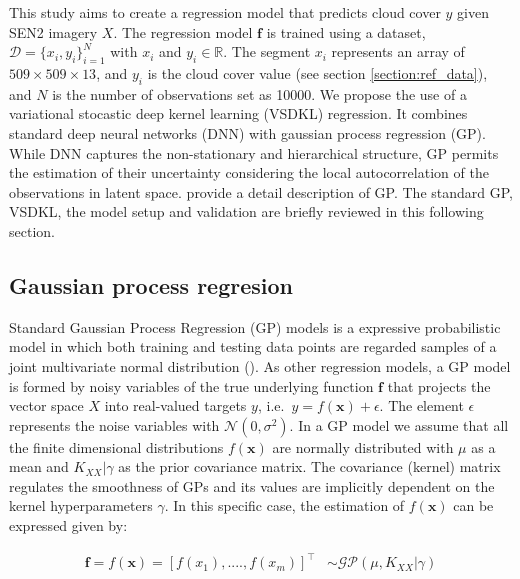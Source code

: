 \documentclass[a4paper, nobind]{templates/cdethesis}
\begin{document}
This study aims to create a regression model that predicts cloud cover \(y\) given SEN2 imagery \(X\). The regression model \(\mathbf{f}\) is trained using a dataset, \(\mathcal{D} = \{x_i, y_i\}^{N}_{i=1}\) with \(x_i\) and \(y_i \in \mathbb{R}\). The segment \(x_i\) represents an array of \(509 \times 509 \times 13\), and \(y_i\) is the cloud cover value (see section \ref{section:ref_data}), and \(N\) is the number of observations set as 10000. We propose the use of a variational stocastic deep kernel learning (VSDKL) regression. It combines standard deep neural networks (DNN) with gaussian process regression (GP). While DNN captures the non-stationary and hierarchical structure, GP permits the estimation of their uncertainty considering the local autocorrelation of the observations in latent space. \cite{rasmussen2003gaussian} provide a detail description of GP. The standard GP, VSDKL, the model setup and validation are briefly reviewed in this following section.

\subsection{Gaussian process regresion}

Standard Gaussian Process Regression (GP) models is a expressive probabilistic model in which both training and testing data points are regarded samples of a joint multivariate normal distribution (\cite{williams2006gaussian}). As other regression models, a GP model is formed by noisy variables of the true underlying function \(\mathbf{f}\) that projects the vector space \(X\) into real-valued targets \(y\), i.e.~\(y = f(\mathbf{x}) + \epsilon\). The element \(\epsilon\) represents the noise variables with \(\mathcal{N}(0, \sigma^{2})\). In a GP model we assume that all the finite dimensional distributions \(f(\mathbf{x})\) are normally distributed with \(\mu\) as a mean and \(K_{XX}|\gamma\) as the prior covariance matrix. The covariance (kernel) matrix regulates the smoothness of GPs and its values are implicitly dependent on the kernel hyperparameters \(\gamma\). In this specific case, the estimation of \(f(\mathbf{x})\) can be expressed given by:

\begin{equation}
\begin{aligned}
\mathbf{f} = f(\mathbf{x}) = [f(x_1), ...., f(x_m)]^\top & \sim 
\mathcal{GP}\left(
  \mu, K_{XX}|\gamma\right
) \\
\end{aligned} \label{eq:1}
\end{equation}
\end{document}
